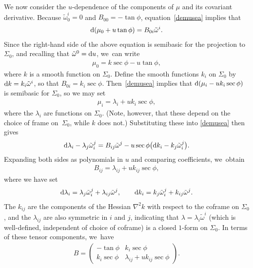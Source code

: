 \documentclass[pdftex]{sigma}
\def\wt{\tilde\omega}
\numberwithin{equation}{section}
\begin{document}
We now consider the $u$-dependence of the components of $\mu$ and its covariant derivative. Because $\wt^i_0=0$ and $B_{00}=-\tan\phi$, equation~\eqref{demusea} implies that
\begin{gather*}
{\rm d}(\mu_0 + u \tan\phi) = B_{0i} \wt^i.
\end{gather*} Since the right-hand side of the above equation is semibasic for the projection to $\Sigma_0$, and recalling that $\wt^0 = {\rm d}u$, we~can write
\begin{gather} \label{mu0eq}
\mu_0 = k\sec\phi - u \tan\phi,
\end{gather}
where $k$ is a smooth function on $\Sigma_0$. Define the smooth functions $k_i$ on $\Sigma_0$ by ${\rm d}k = k_i \wt^i$, so that $B_{0i} = k_i \sec \phi$. Then~\eqref{demusea} implies that ${\rm d}(\mu_i - u k_i \sec\phi)$ is semibasic for $\Sigma_0$, so we may set
\begin{gather*}
\mu_i = \lambda_i + u k_i \sec\phi,
\end{gather*}
where the $\lambda_i$ are functions on $\Sigma_0$. (Note, however, that these depend on the choice of frame on~$\Sigma_0$, while $k$ does not.) Substituting these into
\eqref{demusea} then gives
\begin{gather*}
{\rm d}\lambda_i -\lambda_j \wt^j_i = B_{ij} \wt^j - u\sec\phi \big({\rm d}k_i -k_j \wt^j_i\big).
\end{gather*}
Expanding both sides as polynomials in $u$ and comparing coefficients, we~obtain
\begin{gather*}
B_{ij} = \lambda_{ij}+ u k_{ij} \sec\phi,
\end{gather*}
where we have set
\begin{gather*}
{\rm d}\lambda_i = \lambda_j \wt^j_i + \lambda_{ij} \wt^j, \qquad
{\rm d}k_i = k_j\wt^j_i + k_{ij} \wt^j.
\end{gather*}
The $k_{ij}$ are the components of the Hessian $\nabla^2 k$ with respect to the coframe on $\Sigma_0$, and the $\lambda_{ij}$ are also symmetric in $i$ and $j$, indicating that $\lambda = \lambda_i \wt^i$ (which is well-defined, independent of choice of coframe) is a closed $1$-form on $\Sigma_0$. In terms of these tensor components, we~have
\begin{gather} \label{cylinderBform}
B = \begin{pmatrix} -\tan \phi & k_i \sec\phi \\ k_i \sec\phi & \lambda_{ij} + u k_{ij} \sec\phi \end{pmatrix}.
\end{gather}
\end{document}

